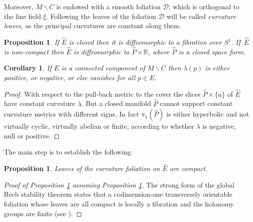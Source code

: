 \documentclass[10pt]{amsart}
\let\mathcal\mathscr
\let\moins\smallsetminus
\newtheorem{proposition}[theorem]{Proposition}
\newtheorem{corollary}[theorem]{Corollary}
\theoremstyle{definition}
\theoremstyle{remark}
\numberwithin{equation}{section}
\begin{document}
Moreover, $M\moins C$ is endowed with a smooth foliation $\mathcal D$, which is orthogonal to the line field $\xi$.
Following \cite{Re} the leaves of the foliation $\mathcal D$ will be called \emph{curvature leaves},
as the principal curvatures are constant along them.

\begin{proposition}\label{dicho}
If $\widehat{E}$ is closed then it is diffeomorphic to a
fibration over $S^1$. If~$\widehat{E}$ is non-compact then
$\widehat{E}$ is diffeomorphic to $\widehat{P}\times \mathbb R$, where
$\widehat{P}$ is a closed space form.
\end{proposition}

\begin{corollary}\label{sign}
If $E$ is a connected component of $M\moins C$ then
$\lambda(p)$ is either positive, or negative, or else
vanishes for all $p\in E$.
\end{corollary}
\begin{proof}
With respect to the pull-back metric to the cover the slices
$\widehat{P}\times \{a\}$ of $\widehat{E}$ have constant curvature $\lambda$.
But a closed manifold $\widehat{P}$ cannot support constant
curvature metrics with different signs. In fact $\pi_1(\widehat{P})$ is either
hyperbolic and not virtually cyclic, virtually abelian or finite, according to whether $\lambda$ is negative, null or positive.
\end{proof}

The main step is to establish the following:

\begin{proposition}\label{compactleaf}
Leaves of the curvature foliation on $\widehat{E}$ are compact.
\end{proposition}

\begin{proof}[Proof of Proposition \ref{dicho}
assuming Proposition \ref{compactleaf}]
The strong form of the global Reeb stability theorem states that
a codimension-one transversely orientable
foliation whose leaves are all compact
is locally a fibration and the holonomy groups are finite (see
\cite{Mil,EMS}).
\end{proof}
\end{document}
